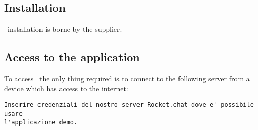 \subsection{Installation}
\app\ installation is borne by the supplier.

\subsection{Access to the application}
To access \app\, the only thing required is to connect to the following  server from a device which has access to the internet:
\begin{lstlisting}
Inserire credenziali del nostro server Rocket.chat dove e' possibile usare 
l'applicazione demo.
\end{lstlisting}


\newpage